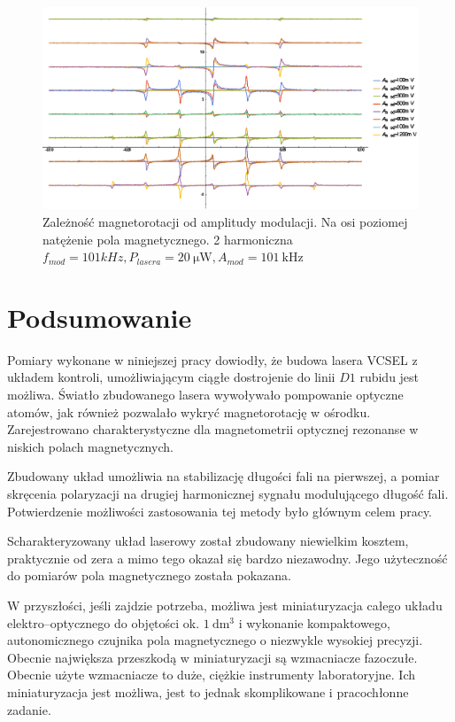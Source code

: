 \documentclass[a4paper,10pt,twoside]{report}
\begin{document}
\begin{figure}[h!]
\centering
 \includegraphics[width=\textwidth]{panoramy_2H_odam.eps}
 \caption{Zależność magnetorotacji od amplitudy modulacji. Na osi poziomej natężenie pola magnetycznego. 2 harmoniczna $f_{mod}=101kHz,P_{lasera}=20~\mathrm{ \mu W}, A_{mod}=101~\mathrm{kHz}$}
 \label{fig:panodam2}
\end{figure}



\chapter{Podsumowanie}

Pomiary wykonane w niniejszej pracy dowiodły, że budowa lasera VCSEL z układem kontroli, umożliwiającym ciągłe dostrojenie do linii $D1$ rubidu jest możliwa. Światło zbudowanego lasera wywoływało pompowanie optyczne atomów, jak również pozwalało wykryć magnetorotację w ośrodku. Zarejestrowano charakterystyczne dla magnetometrii optycznej rezonanse w niskich polach magnetycznych.

Zbudowany układ umożliwia na stabilizację długości fali na pierwszej, a pomiar skręcenia polaryzacji na drugiej harmonicznej sygnału modulującego długość fali.
Potwierdzenie możliwości zastosowania tej metody było głównym celem pracy.

Scharakteryzowany układ laserowy został zbudowany niewielkim kosztem, praktycznie od zera a mimo tego okazał się bardzo niezawodny. Jego użyteczność do pomiarów pola magnetycznego została pokazana.

 W przyszłości, jeśli zajdzie potrzeba, możliwa jest miniaturyzacja całego układu elektro--optycznego do objętości ok. $1~\mathrm{dm^3}$ i wykonanie kompaktowego, autonomicznego czujnika pola magnetycznego o niezwykle wysokiej precyzji.
Obecnie największa przeszkodą w miniaturyzacji są wzmacniacze fazoczułe. Obecnie użyte wzmacniacze to duże, ciężkie instrumenty laboratoryjne. Ich miniaturyzacja jest możliwa, jest to jednak skomplikowane i pracochłonne zadanie.
\end{document}
